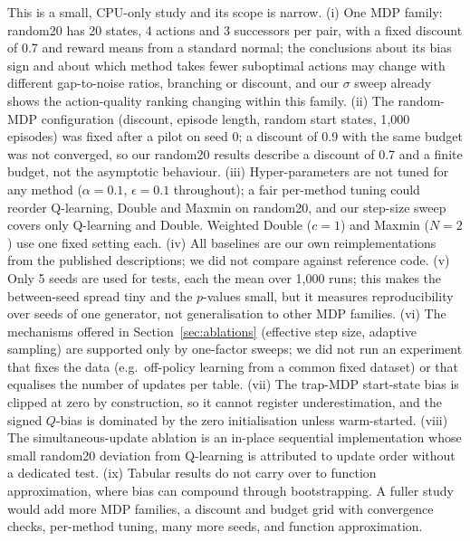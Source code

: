 This is a small, CPU-only study and its scope is narrow. (i) One MDP family: random20 has 20 states, 4 actions and 3 successors per pair, with a fixed discount of 0.7 and reward means from a standard normal; the conclusions about its bias sign and about which method takes fewer suboptimal actions may change with different gap-to-noise ratios, branching or discount, and our $\sigma$ sweep already shows the action-quality ranking changing within this family. (ii) The random-MDP configuration (discount, episode length, random start states, 1{,}000 episodes) was fixed after a pilot on seed 0; a discount of 0.9 with the same budget was not converged, so our random20 results describe a discount of 0.7 and a finite budget, not the asymptotic behaviour. (iii) Hyper-parameters are not tuned for any method ($\alpha=0.1$, $\epsilon=0.1$ throughout); a fair per-method tuning could reorder Q-learning, Double and Maxmin on random20, and our step-size sweep covers only Q-learning and Double. Weighted Double ($c=1$) and Maxmin ($N=2$) use one fixed setting each. (iv) All baselines are our own reimplementations from the published descriptions; we did not compare against reference code. (v) Only 5 seeds are used for tests, each the mean over 1{,}000 runs; this makes the between-seed spread tiny and the $p$-values small, but it measures reproducibility over seeds of one generator, not generalisation to other MDP families. (vi) The mechanisms offered in Section~\ref{sec:ablations} (effective step size, adaptive sampling) are supported only by one-factor sweeps; we did not run an experiment that fixes the data (e.g.\ off-policy learning from a common fixed dataset) or that equalises the number of updates per table. (vii) The trap-MDP start-state bias is clipped at zero by construction, so it cannot register underestimation, and the signed $Q$-bias is dominated by the zero initialisation unless warm-started. (viii) The simultaneous-update ablation is an in-place sequential implementation whose small random20 deviation from Q-learning is attributed to update order without a dedicated test. (ix) Tabular results do not carry over to function approximation, where bias can compound through bootstrapping. A fuller study would add more MDP families, a discount and budget grid with convergence checks, per-method tuning, many more seeds, and function approximation.
